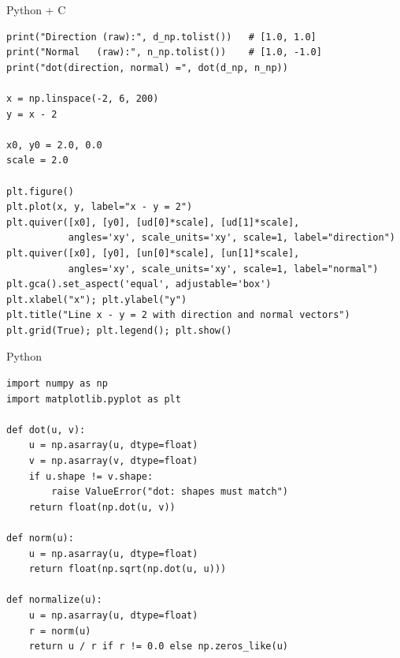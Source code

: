 \documentclass{beamer}
\begin{document}
\begin{frame}[fragile]{Python + C }
\begin{lstlisting}
print("Direction (raw):", d_np.tolist())   # [1.0, 1.0]
print("Normal   (raw):", n_np.tolist())    # [1.0, -1.0]
print("dot(direction, normal) =", dot(d_np, n_np))

x = np.linspace(-2, 6, 200)
y = x - 2

x0, y0 = 2.0, 0.0
scale = 2.0

plt.figure()
plt.plot(x, y, label="x - y = 2")
plt.quiver([x0], [y0], [ud[0]*scale], [ud[1]*scale],
           angles='xy', scale_units='xy', scale=1, label="direction")
plt.quiver([x0], [y0], [un[0]*scale], [un[1]*scale],
           angles='xy', scale_units='xy', scale=1, label="normal")
plt.gca().set_aspect('equal', adjustable='box')
plt.xlabel("x"); plt.ylabel("y")
plt.title("Line x - y = 2 with direction and normal vectors")
plt.grid(True); plt.legend(); plt.show()
\end{lstlisting}
\end{frame}

\begin{frame}[fragile]{Python}
\begin{lstlisting}
import numpy as np
import matplotlib.pyplot as plt

def dot(u, v):
    u = np.asarray(u, dtype=float)
    v = np.asarray(v, dtype=float)
    if u.shape != v.shape:
        raise ValueError("dot: shapes must match")
    return float(np.dot(u, v))

def norm(u):
    u = np.asarray(u, dtype=float)
    return float(np.sqrt(np.dot(u, u)))

def normalize(u):
    u = np.asarray(u, dtype=float)
    r = norm(u)
    return u / r if r != 0.0 else np.zeros_like(u)
\end{lstlisting}
\end{frame}
\end{document}
